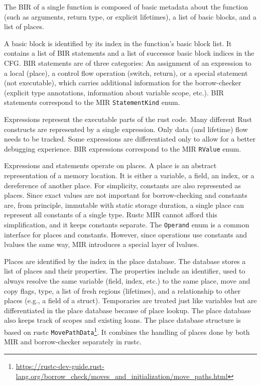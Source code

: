 \documentclass[
  11pt,
]{report}
\DeclareRobustCommand{\href}[2]{#2\footnote{\url{#1}}}
\begin{document}
The BIR of a single function is composed of basic metadata about the
function (such as arguments, return type, or explicit lifetimes), a list
of basic blocks, and a list of places.

A basic block is identified by its index in the function's basic block
list. It contains a list of BIR statements and a list of successor basic
block indices in the CFG. BIR statements are of three categories: An
assignment of an expression to a local (place), a control flow operation
(switch, return), or a special statement (not executable), which carries
additional information for the borrow-checker (explicit type
annotations, information about variable scope, etc.). BIR statements
correspond to the MIR \texttt{StatementKind} enum.

Expressions represent the executable parts of the rust code. Many
different Rust constructs are represented by a single expression. Only
data (and lifetime) flow needs to be tracked. Some expressions are
differentiated only to allow for a better debugging experience. BIR
expressions correspond to the MIR \texttt{RValue} enum.

Expressions and statements operate on places. A place is an abstract
representation of a memory location. It is either a variable, a field,
an index, or a dereference of another place. For simplicity, constants
are also represented as places. Since exact values are not important for
borrow-checking and constants are, from principle, immutable with static
storage duration, a single place can represent all constants of a single
type. Rustc MIR cannot afford this simplification, and it keeps
constants separate. The \texttt{Operand} enum is a common interface for
places and constants. However, since operations use constants and
lvalues the same way, MIR introduces a special layer of lvalues.

Places are identified by the index in the place database. The database
stores a list of places and their properties. The properties include an
identifier, used to always resolve the same variable (field, index,
etc.) to the same place, move and copy flags, type, a list of fresh
regions (lifetimes), and a relationship to other places (e.g., a field
of a struct). Temporaries are treated just like variables but are
differentiated in the place database because of place lookup. The place
database also keeps track of scopes and existing loans. The place
database structure is based on rustc
\href{https://rustc-dev-guide.rust-lang.org/borrow_check/moves_and_initialization/move_paths.html}{\texttt{MovePathData}}.
It combines the handling of places done by both MIR and borrow-checker
separately in rustc.
\end{document}
